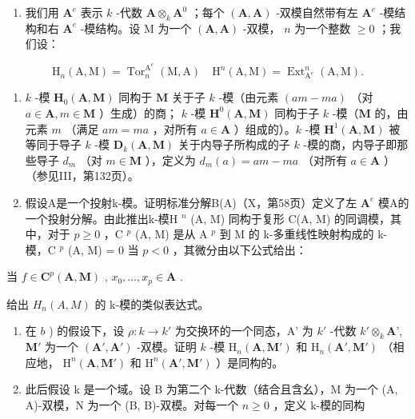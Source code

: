 \begin{enumerate}
\def\labelenumi{\arabic{enumi})}
\setcounter{enumi}{25}
\tightlist
\item
  我们用 \(\mathbf{A}^e\) 表示 \(k\) -代数 \(\mathbf{A} \otimes_k \mathbf{A}^0\) ；每个 \((\mathbf{A}, \mathbf{A})\) -双模自然带有左 \(\mathbf{A}^e\) -模结构和右 \(\mathbf{A}^e\) -模结构。设 M 为一个 \((\mathbf{A}, \mathbf{A})\) -双模， \(n\) 为一个整数 \(\geqslant 0\) ；我们设：
\end{enumerate}

\[
\mathrm{H} _ {n} (\mathrm{A}, \mathrm{M}) = \operatorname{Tor} _ {n} ^ {\mathrm{A} ^ {e}} (\mathrm{M}, \mathrm{A}) \quad \mathrm{H} ^ {n} (\mathrm{A}, \mathrm{M}) = \operatorname{Ext} _ {\mathrm{A} ^ {e}} ^ {n} (\mathrm{A}, \mathrm{M}).
\]

\begin{enumerate}
\def\labelenumi{\alph{enumi})}
\item
  \(k\) -模 \(\mathbf{H}_0(\mathbf{A}, \mathbf{M})\) 同构于 \(\mathbf{M}\) 关于子 \(k\) -模（由元素 \((am - ma)\) （对 \(a \in \mathbf{A}, m \in \mathbf{M}\) ）生成）的商； \(k\) -模 \(\mathbf{H}^0(\mathbf{A}, \mathbf{M})\) 同构于子 \(k\) -模（\(\mathbf{M}\) 的，由元素 \(m\) （满足 \(am = ma\) ，对所有 \(a \in \mathbf{A}\) ）组成的）。\(k\) -模 \(\mathbf{H}^1(\mathbf{A}, \mathbf{M})\) 被等同于导子 \(k\) -模 \(\mathbf{D}_k(\mathbf{A}, \mathbf{M})\) 关于内导子所构成的子 \(k\) -模的商，内导子即那些导子 \(d_m\) （对 \(m \in \mathbf{M}\) ），定义为 \(d_m(a) = am - ma\) （对所有 \(a \in \mathbf{A}\) ）（参见III，第132页）。
\item
  假设A是一个投射k-模。证明标准分解B(A)（X，第58页）定义了左 \(\mathbf{A}^{e}\) 模A的一个投射分解。由此推出k-模H \(^{n}\) (A, M) 同构于复形 C(A, M) 的同调模，其中，对于 \(p \geqslant 0\) ，C \(^{p}\) (A, M) 是从 A \(^{p}\) 到 M 的 k-多重线性映射构成的 k-模，C \(^{p}\) (A, M) = 0 当 \(p < 0\) ，其微分由以下公式给出：
\end{enumerate}

当 \(f \in \mathbf{C}^p(\mathbf{A}, \mathbf{M})\) , \(x_0, \ldots, x_p \in \mathbf{A}\) .

给出 \(H_{n}(A, M)\) 的 k-模的类似表达式。

\begin{enumerate}
\def\labelenumi{\alph{enumi})}
\setcounter{enumi}{2}
\item
  在 \(b\) ) 的假设下，设 \(\rho : k \to k'\) 为交换环的一个同态，A' 为 \(k'\) -代数 \(k' \otimes_k \mathbf{A}\)', \(\mathbf{M}'\) 为一个 \((\mathbf{A}', \mathbf{A}')\) -双模。证明 \(k\) -模 \(\mathrm{H}_n(\mathbf{A}, \mathbf{M}')\) 和 \(\mathrm{H}_n(\mathbf{A}', \mathbf{M}')\) （相应地， \(\mathrm{H}^n(\mathbf{A}, \mathbf{M}')\) 和 \(\mathrm{H}^n(\mathbf{A}', \mathbf{M}')\) ）是同构的。
\item
  此后假设 k 是一个域。设 B 为第二个 k-代数（结合且含幺），M 为一个 (A, A)-双模，N 为一个 (B, B)-双模。对每一个 \(n \geqslant 0\) ，定义 k-模的同构
\end{enumerate}

